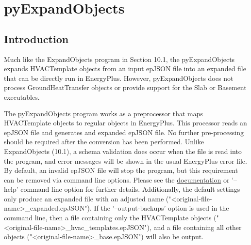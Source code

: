 \section{pyExpandObjects}

\subsection{Introduction}\label{pyExpandObjects}

Much like the ExpandObjects program in Section 10.1, the pyExpandObjects expands HVACTemplate objects from an input epJSON file into an expanded file that can be directly run in EnergyPlus.  However, pyExpandObjects does not process GroundHeatTransfer objects or provide support for the Slab or Basement executables.

The pyExpandObjects program works as a preprocessor that maps HVACTemplate objects to regular objects in EnergyPlus.  This processor reads an epJSON file and generates and expanded epJSON file.  No further pre-processing should be required after the conversion has been performed.  Unlike ExpandObjects (10.1), a schema validation does occur when the file is read into the program, and error messages will be shown in the usual EnergyPlus error file.  By default, an invalid epJSON file will stop the program, but this requirement can be removed via command line options.  Please see the \href{https://epjson-expandobjects.readthedocs.io/en/latest/?badge=latest}{documentation} or '--help' command line option for further details.  Additionally, the default settings only produce an expanded file with an adjusted name ("<original-file-name>\_expanded.epJSON"). If the '--output-backups' option is used in the command line, then a file containing only the HVACTemplate objects ("<original-file-name>\_hvac\_templates.epJSON"), and a file containing all other objects ("<original-file-name>\_base.epJSON") will also be output.